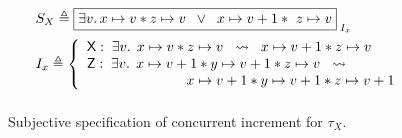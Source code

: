 \begin{figure}
\noindent\makebox[\linewidth]{\rule{\linewidth}{1pt}}
%
\[
\begin{array}{l }
	S_{X} \eqdef 
	\shared{
		\exsts{v}   \cell{x}{v}  * \cell{z}{v}  \;\;\lor\;\; \cell{x}{v+1}  *\ \cell{z}{v}	
	}{I_x}\vspace*{5pt}\\
	

	
	I_x \eqdef \left\{
		\begin{array}{l}
			\textsf{X}:\; \exsts{v}\; \cell{x}{v} * \cell{z}{v}  \hspace*{0.2cm}\swap\hspace*{0.2cm}  \cell{x}{v+1} * \cell{z}{v}\\
			\textsf{Z}:\; \exsts{v}\; \cell{x}{v+1} *  \cell{y}{v+1} * \cell{z}{v}\hspace*{0.2cm}\swap\\
			\hspace*{2.5cm} \cell{x}{v+1} * \cell{y}{v+1} * \cell{z}{v+1}\\
		\end{array}			
	
	\right.
	\vspace*{5pt}\\
	
\end{array} \vspace*{-5pt}
\]
%
\noindent\makebox[\linewidth]{\rule{\linewidth}{1pt}}
\caption{Subjective specification of concurrent increment for $\tau_X$.}
\label{fig:concurrentIncSubjectiveSpec}
\end{figure} 
%
%

